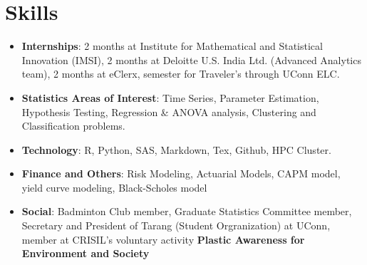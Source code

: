 \documentclass[letterpaper,11pt]{article}
\newcommand{\resumeItem}[2]{
  \item\small{
    \textbf{#1}{: #2 \vspace{-2pt}}
  }
}
\newcommand{\resumeSubItem}[2]{\resumeItem{#1}{#2}\vspace{-4pt}}
\newcommand{\resumeSubHeadingListStart}{\begin{itemize}[leftmargin=*]}
\newcommand{\resumeSubHeadingListEnd}{\end{itemize}}
\begin{document}
\section{Skills}
  \resumeSubHeadingListStart
    \resumeSubItem{Internships}
      {2 months at Institute for Mathematical and Statistical Innovation (IMSI), 2 months at Deloitte U.S. India Ltd.  (Advanced Analytics team),  2 months at eClerx, semester for Traveler's through UConn ELC.}
    \resumeSubItem{Statistics Areas of Interest}
      {Time Series, Parameter Estimation, Hypothesis Testing, Regression \& ANOVA analysis, Clustering and Classification problems.}
    \resumeSubItem{Technology}
      {R, Python, SAS, Markdown, Tex, Github, HPC Cluster.}
    \resumeSubItem{Finance and Others}
      {Risk Modeling, Actuarial Models, CAPM model, yield curve modeling, Black-Scholes model}
    \resumeSubItem{Social}
      {Badminton Club member, Graduate Statistics Committee member,  Secretary and President of Tarang (Student Orgranization) at UConn,  member at CRISIL's voluntary activity {\bf Plastic Awareness for Environment and Society}}      
  \resumeSubHeadingListEnd

\end{document}
